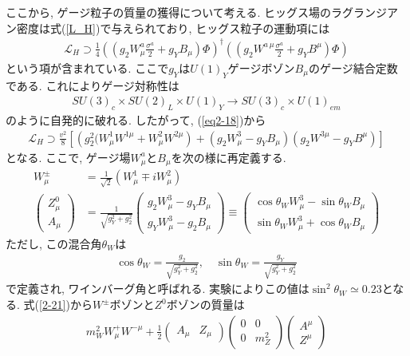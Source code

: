 ここから, ゲージ粒子の質量の獲得について考える.
ヒッグス場のラグランジアン密度は式(\ref{L_H})で与えられており, ヒッグス粒子の運動項には
\begin{align}
  \mathcal{L}_H \supset \frac{1}{4}\left((g_2W^a_\mu\frac{\sigma^a}{2}+g_Y B_\mu)\Phi\right)^\dagger \left((g_2W^{a\,\mu}\frac{\sigma^a}{2}+g_YB^\mu)\Phi\right)\label{eq2-18}
\end{align}
という項が含まれている.
ここで$g_Y$は$U(1)_Y$ゲージボゾン$B_\mu$のゲージ結合定数である.
これによりゲージ対称性は
\begin{align}
  SU(3)_c\times SU(2)_L\times U(1)_Y \rightarrow SU(3)_c\times U(1)_{em}
\end{align}
のように自発的に破れる.
したがって, (\ref{eq2-18})から
\begin{align}
  \mathcal{L}_H \supset \frac{v^2}{8}\left[\left(g_2^2(W^1_\mu  W^{1\mu}+W^2_\mu  W^{2\mu}\right)+ (g_2W_\mu^3 -g_Y B_\mu)(g_2W^{3\mu}-g_Y B^{\mu})\right] \label{2-21}
\end{align}
となる.
ここで, ゲージ場$W_\mu^a$と$B_\mu$を次の様に再定義する.
\begin{align}
  W_\mu^\pm &= \frac{1}{\sqrt{2}}(W_\mu ^1 \mp i W_\mu^2)\\
  \left(\begin{array}{c}
      Z_\mu^0 \\
      A_\mu
      \end{array}\right)&=\frac{1}{\sqrt{g_Y^2+g_2^2}}\left(\begin{array}{c}
      g_2 W_\mu^3-g_Y B_\mu \\
      g_Y W_\mu^3-g_2 B_\mu 
    \end{array}\right)
    \equiv \left(\begin{array}{cc}
        \cos\theta_W W_\mu^3 - \sin\theta_W B_\mu \\
        \sin\theta_W W_\mu^3 + \cos\theta_W B_\mu
      \end{array}
    \right)\label{eq2-22}
\end{align}
ただし, この混合角$\theta_W$は
\begin{align}
  \cos\theta_W = \frac{g_2}{\sqrt{g_Y^2 + g_2^2}},\quad \sin\theta_W = \frac{g_Y}{\sqrt{g_Y^2 + g_2^2}}\nonumber
\end{align}
で定義され, ワインバーグ角と呼ばれる.
実験によりこの値は$\sin^2\theta_W \simeq 0.23$となる.
式(\ref{2-21})から$W^\pm$ボゾンと$Z^0$ボゾンの質量は
\begin{align}
  m_W^2 W_\mu^+W^{-\mu} + \frac{1}{2}\left(\begin{array}{cc}
      A_\mu & Z_\mu
    \end{array}\right) \left(\begin{array}{cc}
      0 & 0 \\
      0 & m_Z^2 
      \end{array}\right)\left(\begin{array}{c}
      A^\mu \\
      Z^\mu
  \end{array}\right)\label{eq2-23}
\end{align}
